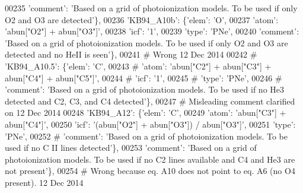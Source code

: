 \begin{DoxyCode}
00235                                       \textcolor{stringliteral}{'comment'}: \textcolor{stringliteral}{'Based on a grid of photoionization models. To be used if
       only O2 and O3 are detected'}\},
00236                          \textcolor{stringliteral}{'KB94\_A10b'}: \{\textcolor{stringliteral}{'elem'}: \textcolor{stringliteral}{'O'},
00237                                       \textcolor{stringliteral}{'atom'}: \textcolor{stringliteral}{'abun["O2"] + abun["O3"]'},
00238                                       \textcolor{stringliteral}{'icf'}: \textcolor{stringliteral}{'1'},
00239                                       \textcolor{stringliteral}{'type'}: \textcolor{stringliteral}{'PNe'},
00240                                       \textcolor{stringliteral}{'comment'}: \textcolor{stringliteral}{'Based on a grid of photoionization models. To be used if
       only O2 and O3 are detected and no HeII is seen'}\},
00241 \textcolor{comment}{# Wrong  12 Dec 2014}
00242 \textcolor{comment}{#                         'KB94\_A10.5': \{'elem': 'C',}
00243 \textcolor{comment}{#                                        'atom': 'abun["C2"] + abun["C3"] + abun["C4"] + abun["C5"]',}
00244 \textcolor{comment}{#                                        'icf': '1',}
00245 \textcolor{comment}{#                                        'type': 'PNe',}
00246 \textcolor{comment}{#                                        'comment': 'Based on a grid of photoionization models. To be used
       if no He3 detected and C2, C3, and C4 detected'\},}
00247 \textcolor{comment}{# Misleading comment clarified on 12 Dec 2014 }
00248                         \textcolor{stringliteral}{'KB94\_A12'}: \{\textcolor{stringliteral}{'elem'}: \textcolor{stringliteral}{'C'},
00249                                       \textcolor{stringliteral}{'atom'}: \textcolor{stringliteral}{'abun["C3"] + abun["C4"]'},
00250                                       \textcolor{stringliteral}{'icf'}: \textcolor{stringliteral}{'(abun["O2"] + abun["O3"]) / abun["O3"]'},
00251                                       \textcolor{stringliteral}{'type'}: \textcolor{stringliteral}{'PNe'},
00252 \textcolor{comment}{#                                      'comment': 'Based on a grid of photoionization models. To be used if
       no C II lines detected'\},}
00253                                       \textcolor{stringliteral}{'comment'}: \textcolor{stringliteral}{'Based on a grid of photoionization models. To be used if
       no C2 lines available and C4 and He3 are not present'}\},
00254 \textcolor{comment}{# Wrong because eq. A10 does not point to eq. A6 (no O4 present). 12 Dec 2014}

\end{DoxyCode}
